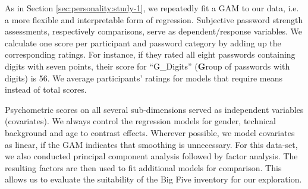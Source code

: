 As in Section \ref{sec:personality:study-1}, we repeatedly fit a \gls{GAM} to our data, i.e. a more flexible and interpretable form of regression. 
Subjective password strength assessments, respectively comparisons, serve as dependent/response variables. We calculate one score per participant and password category by adding up the corresponding ratings. For instance, if they rated all eight passwords containing digits with seven points, their score for ``G\_Digits'' (\textbf{G}roup of passwords with digits) is 56. We average participants' ratings for models that require means instead of total scores. 

Psychometric scores on all several sub-dimensions served as independent variables (covariates). We always control the regression models for gender, technical background and age to contrast effects. Wherever possible, we model covariates as linear, if the GAM indicates that smoothing is unnecessary. For this data-set, we also conducted principal component analysis followed by factor analysis. The resulting factors are then used to fit additional models for comparison. This allows us to evaluate the suitability of the Big Five inventory for our exploration.



